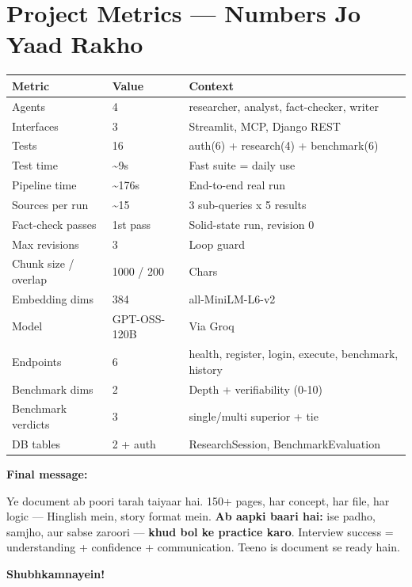 \section{Project Metrics --- Numbers Jo Yaad Rakho}

\begin{longtable}{p{6cm} p{3cm} p{5cm}}
\toprule
\textbf{Metric} & \textbf{Value} & \textbf{Context} \\
\midrule
Agents & 4 & researcher, analyst, fact-checker, writer \\
Interfaces & 3 & Streamlit, MCP, Django REST \\
Tests & 16 & auth(6) + research(4) + benchmark(6) \\
Test time & \textasciitilde9s & Fast suite = daily use \\
Pipeline time & \textasciitilde176s & End-to-end real run \\
Sources per run & \textasciitilde15 & 3 sub-queries x 5 results \\
Fact-check passes & 1st pass & Solid-state run, revision 0 \\
Max revisions & 3 & Loop guard \\
Chunk size / overlap & 1000 / 200 & Chars \\
Embedding dims & 384 & all-MiniLM-L6-v2 \\
Model & GPT-OSS-120B & Via Groq \\
Endpoints & 6 & health, register, login, execute, benchmark, history \\
Benchmark dims & 2 & Depth + verifiability (0-10) \\
Benchmark verdicts & 3 & single/multi superior + tie \\
DB tables & 2 + auth & ResearchSession, BenchmarkEvaluation \\
\bottomrule
\end{longtable}

\begin{storybox}
\textbf{Final message:}

Ye document ab poori tarah taiyaar hai. 150+ pages, har concept, har file, har logic --- Hinglish mein, story format mein. \textbf{Ab aapki baari hai:} ise padho, samjho, aur sabse zaroori --- \textbf{khud bol ke practice karo}. Interview success = understanding + confidence + communication. Teeno is document se ready hain.

\textbf{Shubhkamnayein!} \faHandPeace
\end{storybox}
